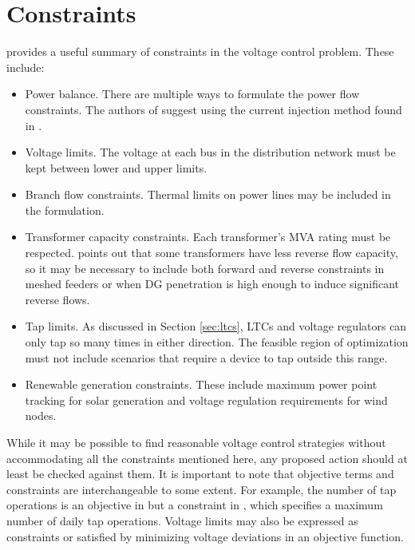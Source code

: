 \documentclass[10pt,letterpaper]{article}
\begin{document}
\section{Constraints}
\label{sec:constraints}
\cite{agalgaonkar2014} provides a useful summary of constraints in the voltage control problem. These include:
\begin{itemize}
	\item Power balance. There are multiple ways to formulate the power flow constraints. The authors of \cite{agalgaonkar2014} suggest using the current injection method found in \cite{garcia2000}.
	\item Voltage limits. The voltage at each bus in the distribution network must be kept between lower and upper limits.
	\item Branch flow constraints. Thermal limits on power lines may be included in the formulation.
	\item Transformer capacity constraints. Each transformer's MVA rating must be respected. \cite{agalgaonkar2014} points out that some transformers have less reverse flow capacity, so it may be necessary to include both forward and reverse constraints in meshed feeders or when DG penetration is high enough to induce significant reverse flows.
	\item Tap limits. As discussed in Section \ref{sec:ltcs}, LTCs and voltage regulators can only tap so many times in either direction. The feasible region of optimization must not include scenarios that require a device to tap outside this range.
	\item Renewable generation constraints. These include maximum power point tracking for solar generation and voltage regulation requirements for wind nodes.
\end{itemize}
While it may be possible to find reasonable voltage control strategies without accommodating all the constraints mentioned here, any proposed action should at least be checked against them. It is important to note that objective terms and constraints are interchangeable to some extent. For example, the number of tap operations is an objective in \cite{agalgaonkar2014} but a constraint in \cite{hu2003}, which specifies a maximum number of daily tap operations. Voltage limits may also be expressed as constraints or satisfied by minimizing voltage deviations in an objective function.
\end{document}
